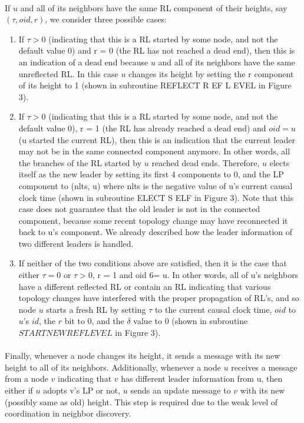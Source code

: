\paragraph{}If $u$ and all of its neighbors have the same RL component of their heights, say $(\tau, oid, r)$, we consider three possible cases:
\begin{enumerate}
	\item If $\tau > 0$ (indicating that this is a RL started by some node, and not the default value 0) and r = 0 (the RL has not reached a dead end), then this is an indication of a dead end because $u$ and all of its neighbors have the same unreflected RL. In this case $u$ changes its height by setting the r component of its height to 1 (shown in subroutine REFLECT R EF L EVEL in Figure 3).
	\item If $\tau > 0$ (indicating that this is a RL started by some node, and not the default value 0), r = 1 (the RL has already reached a dead end) and $oid = u$ (u started the current RL), then this is an indication that the current leader may not be in the same connected component anymore. In other words, all the branches of the RL started by $u$ reached dead ends. Therefore, $u$ elects itself as the new leader by setting its first 4 components to 0, and the LP component to (nlts, u) where nlts is the negative value of u’s current causal clock time (shown in subroutine ELECT S ELF in Figure 3). Note that this case does not guarantee that the old leader is not in the connected component, because some recent topology change may have reconnected it back to u’s component. We already described how the leader information of two different leaders is handled.
	\item If neither of the two conditions above are satisfied, then it is the case that either $\tau = 0$ or $\tau > 0$, r = 1 and oid 6= u. In other words, all of u’s neighbors have a different reflected RL or contain an RL indicating that various topology changes have interfered with the proper propagation of RL’s, and so node $u$ starts a fresh RL by setting $\tau$ to the current causal clock time, $oid$ to $u$’s $id$, the $r$ bit to $0$, and the $\delta$ value to $0$ (shown in subroutine $STARTNEWREFLEVEL$ in Figure 3).
\end{enumerate}
\paragraph{}Finally, whenever a node changes its height, it sends a message with its new height to all of its neighbors. Additionally, whenever a node $u$ receives a message from a node $v$ indicating that $v$ has different leader information from u, then either if $u$ adopts v’s LP or not, $u$ sends an update message to $v$ with its new (possibly same as old) height. This step is required due to the weak level of coordination in neighbor discovery.
